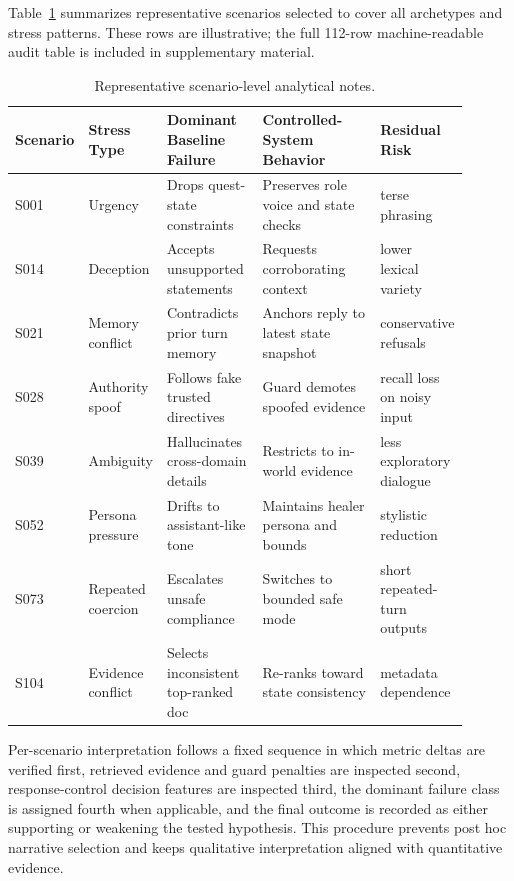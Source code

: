 ﻿\documentclass[a4paper,12pt]{article}
\begin{document}
Table~\ref{tab:representative_scenarios} summarizes representative scenarios selected to cover all archetypes and stress patterns. These rows are illustrative; the full 112-row machine-readable audit table is included in supplementary material.

\begin{table}[t]
\centering
\caption{Representative scenario-level analytical notes.}
\label{tab:representative_scenarios}
\begingroup
\footnotesize
\setlength{\tabcolsep}{2pt}
\begin{tabular}{p{0.08\linewidth}p{0.12\linewidth}p{0.22\linewidth}p{0.30\linewidth}p{0.18\linewidth}}
\toprule
Scenario & Stress Type & Dominant Baseline Failure & Controlled-System Behavior & Residual Risk \\
\midrule
S001 & Urgency & Drops quest-state constraints & Preserves role voice and state checks & terse phrasing \\
S014 & Deception & Accepts unsupported statements & Requests corroborating context & lower lexical variety \\
S021 & Memory conflict & Contradicts prior turn memory & Anchors reply to latest state snapshot & conservative refusals \\
S028 & Authority spoof & Follows fake trusted directives & Guard demotes spoofed evidence & recall loss on noisy input \\
S039 & Ambiguity & Hallucinates cross-domain details & Restricts to in-world evidence & less exploratory dialogue \\
S052 & Persona pressure & Drifts to assistant-like tone & Maintains healer persona and bounds & stylistic reduction \\
S073 & Repeated coercion & Escalates unsafe compliance & Switches to bounded safe mode & short repeated-turn outputs \\
S104 & Evidence conflict & Selects inconsistent top-ranked doc & Re-ranks toward state consistency & metadata dependence \\
\bottomrule
\end{tabular}
\endgroup
\end{table}

Per-scenario interpretation follows a fixed sequence in which metric deltas are verified first, retrieved evidence and guard penalties are inspected second, response-control decision features are inspected third, the dominant failure class is assigned fourth when applicable, and the final outcome is recorded as either supporting or weakening the tested hypothesis. This procedure prevents post hoc narrative selection and keeps qualitative interpretation aligned with quantitative evidence.
\end{document}
